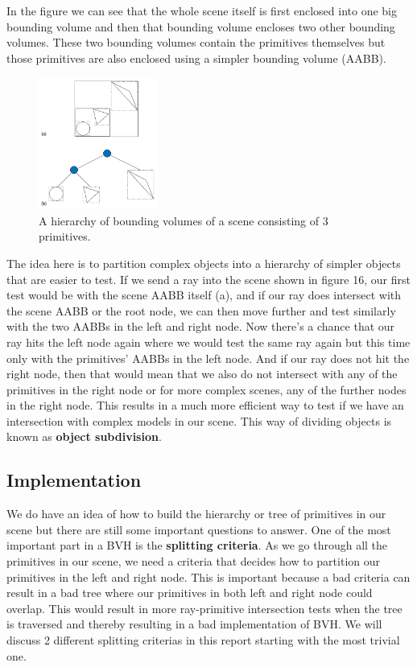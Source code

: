 \documentclass[11pt,a4paper]{article}
\begin{document}
\\~\\
\noindent
In the figure we can see that the whole scene itself is first enclosed into one big bounding volume and then that bounding volume encloses two other bounding volumes. These two bounding volumes contain the primitives themselves but those primitives are also enclosed using a simpler bounding volume (AABB).
\begin{figure}[H]
	\centering
	\captionsetup{justification=centering,margin=2cm}
	\includegraphics[width=0.35\textwidth]{bvh_pbr}
	\caption{A hierarchy of bounding volumes of a scene consisting of 3 primitives. \protect\cite{pharr2016physically}}
\end{figure}
The idea here is to partition complex objects into a hierarchy of simpler objects that are easier to test. If we send a ray into the scene shown in figure 16, our first test would be with the scene AABB itself (a), and if our ray does intersect with the scene AABB or the root node, we can then move further and test similarly with the two AABBs in the left and right node.  Now there's a chance that our ray hits the left node again where we would test the same ray again but this time only with the primitives' AABBs in the left node. And if our ray does not hit the right node, then that would mean that we also do not intersect with any of the primitives in the right node or for more complex scenes, any of the further nodes in the right node. This results in a much more efficient way to test if we have an intersection with complex models in our scene. This way of dividing objects is known as \textbf{object subdivision}.

\subsection{Implementation}
We do have an idea of how to build the hierarchy or tree of primitives in our scene but there are still some important questions to answer. One of the most important part in a BVH is the \textbf{splitting criteria}. As we go through all the primitives in our scene, we need a criteria that decides how to partition our primitives in the left and right node. This is important because a bad criteria can result in a bad tree where our primitives in both left and right node could overlap. This would result in more ray-primitive intersection tests when the tree is traversed and thereby resulting in a bad implementation of BVH. We will discuss 2 different splitting criterias in this report starting with the most trivial one.
\end{document}
